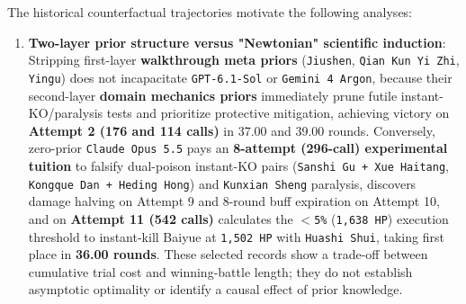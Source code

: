 \documentclass[11pt,a4paper]{article}
\begin{document}
The historical counterfactual trajectories motivate the following analyses:
\begin{enumerate}
\item \textbf{Two-layer prior structure versus "Newtonian" scientific induction}: Stripping first-layer \textbf{walkthrough meta priors} (\texttt{Jiushen}, \texttt{Qian\allowbreak{} \allowbreak{}Kun\allowbreak{} \allowbreak{}Yi\allowbreak{} \allowbreak{}Zhi}, \texttt{Yingu}) does not incapacitate \texttt{GPT\allowbreak{}-\allowbreak{}6\allowbreak{}.\allowbreak{}1\allowbreak{}-\allowbreak{}Sol} or \texttt{Gemini\allowbreak{} \allowbreak{}4\allowbreak{} \allowbreak{}Argon}, because their second-layer \textbf{domain mechanics priors} immediately prune futile instant-KO/paralysis tests and prioritize protective mitigation, achieving victory on \textbf{Attempt 2 (176 and 114 calls)} in 37.00 and 39.00 rounds. Conversely, zero-prior \texttt{Claude\allowbreak{} \allowbreak{}Opus\allowbreak{} \allowbreak{}5\allowbreak{}.\allowbreak{}5} pays an \textbf{8-attempt (296-call) experimental tuition} to falsify dual-poison instant-KO pairs (\texttt{Sanshi\allowbreak{} \allowbreak{}Gu\allowbreak{} \allowbreak{}+\allowbreak{} \allowbreak{}Xue\allowbreak{} \allowbreak{}Haitang}, \texttt{Kongque\allowbreak{} \allowbreak{}Dan\allowbreak{} \allowbreak{}+\allowbreak{} \allowbreak{}Heding\allowbreak{} \allowbreak{}Hong}) and \texttt{Kunxian\allowbreak{} \allowbreak{}Sheng} paralysis, discovers damage halving on Attempt 9 and 8-round buff expiration on Attempt 10, and on \textbf{Attempt 11 (542 calls)} calculates the \texttt{\ensuremath{<}5\%} (\texttt{1\allowbreak{},\allowbreak{}638\allowbreak{} \allowbreak{}HP}) execution threshold to instant-kill Baiyue at \texttt{1\allowbreak{},\allowbreak{}502\allowbreak{} \allowbreak{}HP} with \texttt{Huashi\allowbreak{} \allowbreak{}Shui}, taking first place in \textbf{36.00 rounds}. These selected records show a trade-off between cumulative trial cost and winning-battle length; they do not establish asymptotic optimality or identify a causal effect of prior knowledge.

\end{enumerate}
\end{document}
